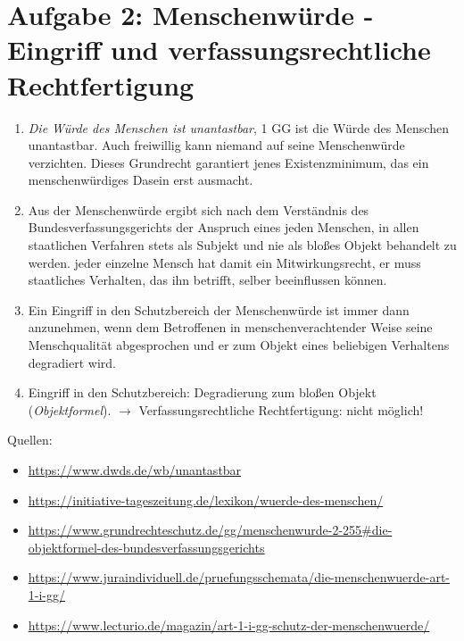 \documentclass{article}
\begin{document}
	\section*{Aufgabe 2: Menschenwürde - Eingriff und verfassungsrechtliche Rechtfertigung}
	\begin{enumerate}[label=(\alph*)]
		\item \textit{Die Würde des Menschen ist unantastbar}, 1 GG ist die Würde des Menschen unantastbar. Auch freiwillig kann niemand auf seine Menschenwürde verzichten. Dieses Grundrecht garantiert jenes Existenzminimum, das ein menschenwürdiges Dasein erst ausmacht.
		\item Aus der Menschenwürde ergibt sich nach dem Verständnis des Bundesverfassungsgerichts der Anspruch eines jeden Menschen, in allen staatlichen Verfahren stets als Subjekt und nie als bloßes Objekt behandelt zu werden. jeder einzelne Mensch hat damit ein Mitwirkungsrecht, er muss staatliches Verhalten, das ihn betrifft, selber beeinflussen können. 
		\item Ein Eingriff in den Schutzbereich der Menschenwürde ist immer dann anzunehmen, wenn dem Betroffenen in menschenverachtender Weise seine Menschqualität abgesprochen und er zum Objekt eines beliebigen Verhaltens degradiert wird.
		\item Eingriff in den Schutzbereich: Degradierung zum bloßen Objekt (\textit{Objektformel}). $\to$ Verfassungsrechtliche Rechtfertigung: nicht möglich!
	\end{enumerate}

		Quellen:
	\begin{itemize}
		\item \url{https://www.dwds.de/wb/unantastbar}
		\item \url{https://initiative-tageszeitung.de/lexikon/wuerde-des-menschen/}
		\item \url{https://www.grundrechteschutz.de/gg/menschenwurde-2-255#die-objektformel-des-bundesverfassungsgerichts}
		\item \url{https://www.juraindividuell.de/pruefungsschemata/die-menschenwuerde-art-1-i-gg/}
		\item \url{https://www.lecturio.de/magazin/art-1-i-gg-schutz-der-menschenwuerde/}
	\end{itemize}
\end{document}
